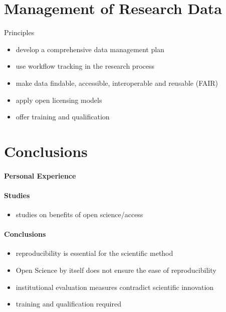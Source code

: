 \documentclass[a4paper, 10pt, twocolumn]{article}
\begin{document}
\section*{Management of Research Data} \label{sec:data_management}

Principles \cite{DFG_GWP:Book,HRK_FDM:WWW,Stodden2014:JORS,H2020_FAIR:ERC}
\begin{itemize}
\item develop a comprehensive data management plan
\item use workflow tracking in the research process
\item make data findable, accessible, interoperable and reusable (FAIR)
\item apply open licensing models
\item offer training and qualification
\end{itemize}


\section*{Conclusions} \label{sec:conclusions} 

\paragraph*{Personal Experience}

\paragraph*{Studies}

\begin{itemize}
\item studies on benefits of open science/access
\end{itemize}

\paragraph*{Conclusions}

\begin{itemize}
\item reproducibility is essential for the scientific method
\item Open Science by itself does not ensure the ease of reproducibility
\item institutional evaluation measures contradict scientific innovation
\item training and qualification required
\end{itemize}


{


}
\end{document}
